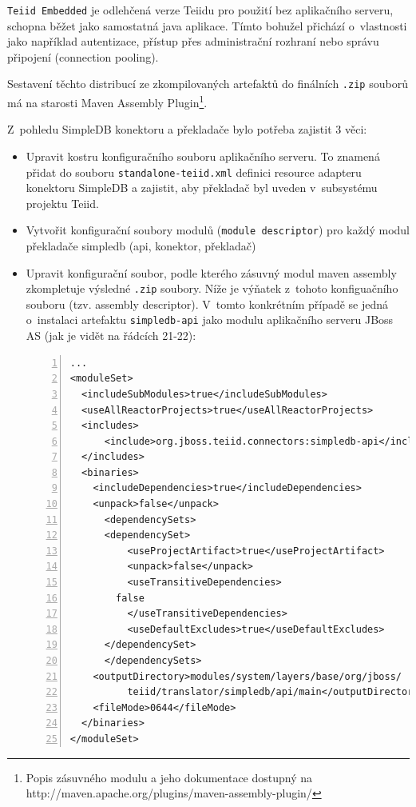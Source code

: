 \documentclass[oneside,12pt]{fithesis2}
\begin{document}
\texttt{Teiid Embedded} je odlehčená verze Teiidu pro použití bez aplikačního serveru, schopna běžet jako samostatná java aplikace. Tímto bohužel přichází o~vlastnosti jako například autentizace, přístup přes administrační rozhraní  nebo správu připojení (connection pooling).

Sestavení těchto distribucí ze zkompilovaných artefaktů do finálních \texttt{.zip} souborů má na starosti Maven Assembly Plugin\footnote{Popis zásuvného modulu a jeho dokumentace dostupný na http://maven.apache.org/plugins/maven-assembly-plugin/}. 

Z~pohledu SimpleDB konektoru a překladače bylo potřeba zajistit 3 věci:

\begin{itemize}
 \item Upravit kostru konfiguračního souboru aplikačního serveru. To znamená přidat do souboru \texttt{standalone-teiid.xml} definici resource adapteru konektoru SimpleDB a zajistit, aby překladač byl uveden v~subsystému projektu Teiid.
 \item Vytvořit konfigurační soubory modulů (\texttt{module descriptor}) pro každý modul překladače simpledb (api, konektor, překladač)
 \item Upravit konfigurační soubor, podle kterého zásuvný modul maven assembly zkompletuje výsledné \texttt{.zip} soubory. Níže je výňatek z~tohoto konfiguačního souboru (tzv. assembly descriptor). V~tomto konkrétním případě se jedná o~instalaci artefaktu \texttt{simpledb-api} jako modulu aplikačního serveru JBoss AS (jak je vidět na řádcích 21-22):
 \begin{Verbatim}[fontsize=\small,numbers=left]
...
<moduleSet>
  <includeSubModules>true</includeSubModules>
  <useAllReactorProjects>true</useAllReactorProjects>
  <includes>
      <include>org.jboss.teiid.connectors:simpledb-api</include>
  </includes>
  <binaries>        
    <includeDependencies>true</includeDependencies>
    <unpack>false</unpack>
      <dependencySets>
	  <dependencySet>
	      <useProjectArtifact>true</useProjectArtifact>
	      <unpack>false</unpack>
	      <useTransitiveDependencies>
		false
	      </useTransitiveDependencies>
	      <useDefaultExcludes>true</useDefaultExcludes>
	  </dependencySet>
      </dependencySets>          
    <outputDirectory>modules/system/layers/base/org/jboss/
	      teiid/translator/simpledb/api/main</outputDirectory>
    <fileMode>0644</fileMode>
  </binaries>
</moduleSet>  
\end{Verbatim}
    
\end{itemize}
\end{document}
